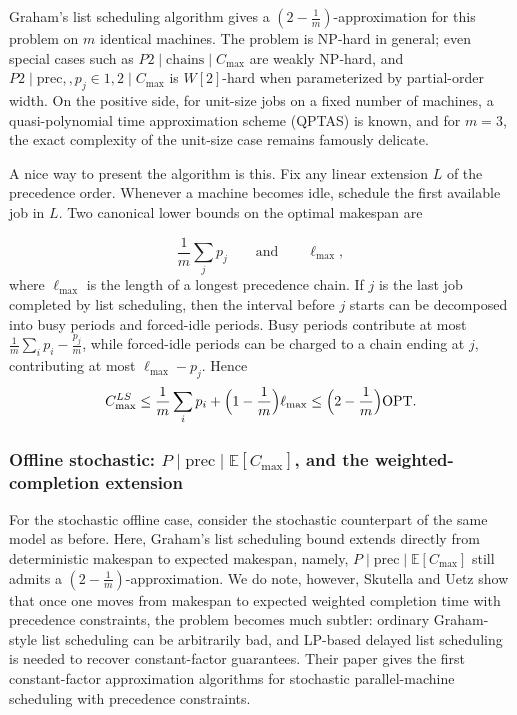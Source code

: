 Graham’s list scheduling algorithm gives a \((2-\tfrac1m)\)-approximation for this problem on \(m\) identical machines. The problem is NP-hard in general; even special cases such as \(P2\mid\mathrm{chains}\mid C_{\max}\) are weakly NP-hard, and \(P2\mid \mathrm{prec},,p_j\in{1,2}\mid C_{\max}\) is $W[2]$-hard when parameterized by partial-order width. On the positive side, for unit-size jobs on a fixed number of machines, a quasi-polynomial time approximation scheme (QPTAS) is known, and for \(m=3\), the exact complexity of the unit-size case remains famously delicate.

A nice way to present the algorithm is this. Fix any linear extension \(L\) of the precedence order. Whenever a machine becomes idle, schedule the first available job in \(L\). Two canonical lower bounds on the optimal makespan are

\[
\frac{1}{m}\sum_{j} p_j
\qquad\text{and}\qquad
\ell_{\max},
\]
where \(\ell_{\max}\) is the length of a longest precedence chain. If \(j\) is the last job completed by list scheduling, then the interval before \(j\) starts can be decomposed into busy periods and forced-idle periods. Busy periods contribute at most \(\frac{1}{m}\sum_i p_i-\frac{p_j}{m}\), while forced-idle periods can be charged to a chain ending at \(j\), contributing at most \(\ell_{\max}-p_j\). Hence
\[
C_{\max}^{LS}\le \frac1m\sum_i p_i+\Bigl(1-\frac1m\Bigr)\ell_{\max}
\le \Bigl(2-\frac1m\Bigr)\mathrm{OPT}.
\]

\subsubsection{Offline stochastic: \(P\mid \mathrm{prec}\mid \mathbb E[C_{\max}]\), and the weighted-completion extension}

For the stochastic offline case, consider the stochastic counterpart of the same model as before. Here, Graham’s list scheduling bound extends directly from deterministic makespan to expected makespan, namely, $P\mid \mathrm{prec}\mid \mathbb E[C_{\max}]$ still admits a \((2-\tfrac1m)\)-approximation. We do note, however, Skutella and Uetz show that once one moves from makespan to expected weighted completion time with precedence constraints, the problem becomes much subtler: ordinary Graham-style list scheduling can be arbitrarily bad, and LP-based delayed list scheduling is needed to recover constant-factor guarantees. Their paper gives the first constant-factor approximation algorithms for stochastic parallel-machine scheduling with precedence constraints.

